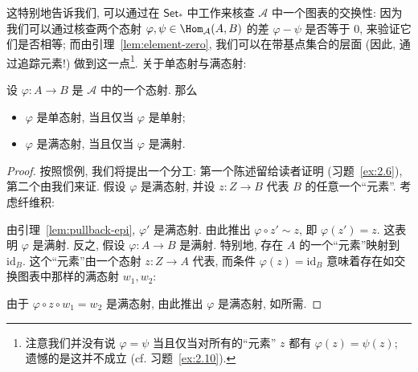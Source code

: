 \indent 这特别地告诉我们, 可以通过在 $\mathsf{Set}_*$ 中工作来核查 $\mathcal{A}$ 中一个图表的交换性: 因为我们可以通过核查两个态射 $\varphi,\psi\in\Hom_{\mathcal{A}}(A,B)$ 的差 $\varphi-\psi$ 是否等于 $0$, 来验证它们是否相等; 而由引理~\ref{lem:element-zero}, 我们可以在带基点集合的层面 (因此, 通过追踪元素!) 做到这一点\footnote{注意我们并没有说 $\varphi=\psi$ 当且仅当对所有的``元素'' $z$ 都有 $\varphi(z)=\psi(z)$; 遗憾的是这并不成立 (cf. 习题~\ref{ex:2.10}).}.
关于单态射与满态射:

\begin{lemma}\label{lem:mono-epi-elements}
设 $\varphi:A\to B$ 是 $\mathcal{A}$ 中的一个态射. 那么
\begin{itemize}
\item $\varphi$ 是单态射, 当且仅当 $\varphi$ 是单射;
\item $\varphi$ 是满态射, 当且仅当 $\varphi$ 是满射.
\end{itemize}
\end{lemma}

\begin{proof}
按照惯例, 我们将提出一个分工: 第一个陈述留给读者证明 (习题~\ref{ex:2.6}), 第二个由我们来证.
假设 $\varphi$ 是满态射, 并设 $z:Z\to B$ 代表 $B$ 的任意一个``元素''. 考虑纤维积:
\begin{center}
\end{center}
由引理~\ref{lem:pullback-epi}, $\varphi'$ 是满态射. 由此推出 $\varphi\circ z'\sim z$, 即 $\varphi(z')=z$. 这表明 $\varphi$ 是满射.
反之, 假设 $\varphi:A\to B$ 是满射. 特别地, 存在 $A$ 的一个``元素''映射到 $\mathrm{id}_B$. 这个``元素''由一个态射 $z:Z\to A$ 代表, 而条件 $\varphi(z)=\mathrm{id}_B$ 意味着存在如交换图表中那样的满态射 $w_1,w_2$:
\begin{center}
\end{center}
由于 $\varphi\circ z\circ w_1=w_2$ 是满态射, 由此推出 $\varphi$ 是满态射, 如所需.
\end{proof}

